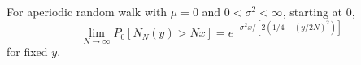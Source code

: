 For aperiodic random walk with \(\mu = 0\) and \(0 < \sigma^2 < \infty\), starting at \(0\),
\[
\lim_{N \to \infty} P_0[N_N(y) > Nx] = e^{-\sigma^2 x / [2(1/4 - (y/2N)^2)]}
\]
for fixed \(y\).
